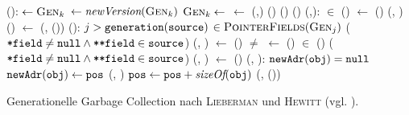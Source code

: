 \begin{algorithm}
\begin{algorithmic}[1]
	\State {}():
	\State \quad {} $\gets \textsc{Gen}_k$
	\State \quad {} $\gets \textit{newVersion}(\textsc{Gen}_k)$
	\State \quad $\textsc{Gen}_k \gets$ 
	\State \quad {} $\gets$ 
	\State \quad {}(,)
	\State \quad {}()
	\State \quad {}()
	\State \quad {}()
	\Statex
	\State {}(,):
	\State \quad \FOREACH {} $\in$ \Handles()
	\State \quad \quad {} $\gets$ ()
	\State \quad \quad {}(, )
	\State \quad \quad {}() $\gets$ (, ())
	\Statex
	\State {}():
	\State \quad \FOREACH $j > \texttt{generation}(\texttt{source})$
	\State \quad \quad \FOREACH {} $\in \textsc{PointerFields}(\textsc{Gen}_j)$
	\State \quad \quad \quad \IF ($\texttt{*field} \neq \texttt{null} \wedge \texttt{**field} \in \texttt{source}$)
	\State \quad \quad \quad \quad {}(, )
	\State \quad \quad \quad \quad {} $\gets$ ()
	\State \quad \WHILE {} $\neq$ \Null
	\State \quad \quad {} $\gets$ ()
	\State \quad \quad \FOREACH {} $\in$ \Fields()
	\State \quad \quad \quad \IF ($\texttt{*field} \neq \texttt{null} \wedge \texttt{**field} \in \texttt{source}$)
	\State \quad \quad \quad \quad {}(, )
	\State \quad \quad \quad \quad {} $\gets$ ()
	\Statex
	\State {}(, ):
	\State \quad \IF $\texttt{newAdr}(\texttt{obj}) = \texttt{null}$
	\State \quad \quad $\texttt{newAdr}(\texttt{obj}) \gets \texttt{pos}$
	\State \quad \quad {}(, )
	\State \quad \quad $\texttt{pos} \gets \texttt{pos} + \textit{sizeOf}(\texttt{obj})$
	\State \quad \quad {}(, ())
\end{algorithmic}
\caption[Generationelle Garbage Collection nach \textsc{Lieberman} und \textsc{Hewitt}]{Generationelle Garbage Collection nach \textsc{Lieberman} und \textsc{Hewitt} (vgl. \cite[S. 421ff]{lieberman1983}).}
\label{algo:lieberman}
\end{algorithm}